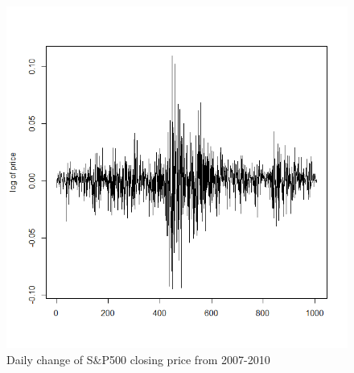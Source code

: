 \documentclass{article}
\begin{document}
\begin{figure}[H]
\centering
\includegraphics[scale=0.3]{sp}
\caption{Daily change of S$\&$P500 closing price from 2007-2010}\label{9}
\end{figure}
\end{document}
